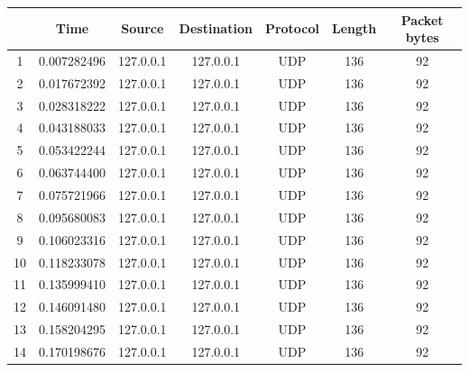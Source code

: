 \documentclass[11pt,a4paper]{article}
\begin{document}
\begin{table}[H]
\centering
\begin{tabular}{|c|c|c|c|c|c|c|}
\hline
   & \textbf{Time} & \textbf{Source} & \textbf{Destination} & \textbf{Protocol} & \textbf{Length} & \textbf{Packet bytes} \\ \hline
1  & 0.007282496   & 127.0.0.1       & 127.0.0.1            & UDP               & 136             & 92                    \\ \hline
2  & 0.017672392   & 127.0.0.1       & 127.0.0.1            & UDP               & 136             & 92                    \\ \hline
3  & 0.028318222   & 127.0.0.1       & 127.0.0.1            & UDP               & 136             & 92                    \\ \hline
4  & 0.043188033   & 127.0.0.1       & 127.0.0.1            & UDP               & 136             & 92                    \\ \hline
5  & 0.053422244   & 127.0.0.1       & 127.0.0.1            & UDP               & 136             & 92                    \\ \hline
6  & 0.063744400   & 127.0.0.1       & 127.0.0.1            & UDP               & 136             & 92                    \\ \hline
7  & 0.075721966   & 127.0.0.1       & 127.0.0.1            & UDP               & 136             & 92                    \\ \hline
8  & 0.095680083   & 127.0.0.1       & 127.0.0.1            & UDP               & 136             & 92                    \\ \hline
9  & 0.106023316   & 127.0.0.1       & 127.0.0.1            & UDP               & 136             & 92                    \\ \hline
10 & 0.118233078   & 127.0.0.1       & 127.0.0.1            & UDP               & 136             & 92                    \\ \hline
11 & 0.135999410   & 127.0.0.1       & 127.0.0.1            & UDP               & 136             & 92                    \\ \hline
12 & 0.146091480   & 127.0.0.1       & 127.0.0.1            & UDP               & 136             & 92                    \\ \hline
13 & 0.158204295   & 127.0.0.1       & 127.0.0.1            & UDP               & 136             & 92                    \\ \hline
14 & 0.170198676   & 127.0.0.1       & 127.0.0.1            & UDP               & 136             & 92                    \\ \hline

\end{tabular}
\end{table}
\end{document}
